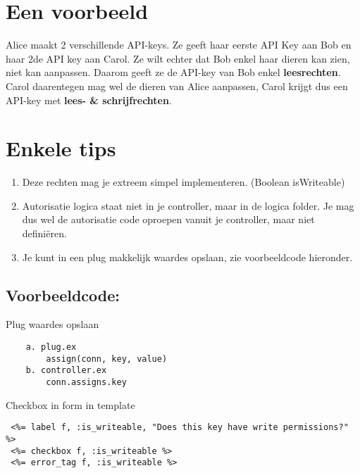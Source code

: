 \documentclass{article}
\begin{document}
\section{Een voorbeeld}
Alice maakt 2 verschillende API-keys. Ze geeft haar eerste API Key aan Bob en haar 2de API key aan Carol. Ze wilt echter dat Bob enkel haar dieren kan zien, niet kan aanpassen. Daarom geeft ze de API-key van Bob enkel \textbf{leesrechten}. Carol daarentegen mag wel de dieren van Alice aanpassen, Carol krijgt dus een API-key met \textbf{lees- \& schrijfrechten}.

\section{Enkele tips}
\begin{enumerate}
    \item Deze rechten mag je extreem simpel implementeren. (Boolean isWriteable)
    \item Autorisatie logica staat niet in je controller, maar in de logica folder. Je mag dus wel de autorisatie code oproepen vanuit je controller, maar niet defini\"eren.
    \item Je kunt in een plug makkelijk waardes opslaan, zie voorbeeldcode hieronder.
\end{enumerate}

\subsection{Voorbeeldcode:}

Plug waardes opslaan
\begin{verbatim}
    a. plug.ex
        assign(conn, key, value)
    b. controller.ex
        conn.assigns.key
\end{verbatim}

Checkbox in form in template
\begin{verbatim}
 <%= label f, :is_writeable, "Does this key have write permissions?" %>
 <%= checkbox f, :is_writeable %>
 <%= error_tag f, :is_writeable %>
\end{verbatim}








\newpage
\end{document}
